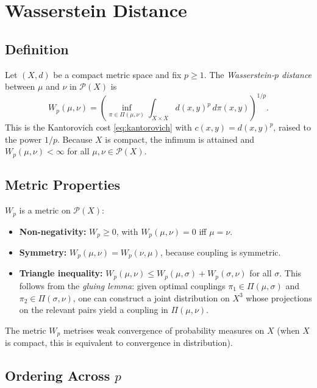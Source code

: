 \documentclass[12pt]{article}
\newcommand{\calP}{\mathcal{P}}
\begin{document}
\section{Wasserstein Distance}
\label{sec:wasserstein}

\subsection{Definition}

Let $(X, d)$ be a compact metric space and fix $p \geq 1$.
The \emph{Wasserstein-$p$ distance} between $\mu$ and $\nu$
in $\calP(X)$ is
\begin{equation}\label{eq:wasserstein}
  \boxed{W_p(\mu, \nu)
  = \left(\inf_{\pi \in \Pi(\mu,\nu)}
    \int_{X\times X} d(x,y)^p\,d\pi(x,y)\right)^{1/p}.}
\end{equation}
This is the Kantorovich cost \eqref{eq:kantorovich} with
$c(x,y) = d(x,y)^p$, raised to the power $1/p$.  Because $X$
is compact, the infimum is attained and $W_p(\mu,\nu) < \infty$
for all $\mu, \nu \in \calP(X)$.

\subsection{Metric Properties}

$W_p$ is a metric on $\calP(X)$:
\begin{itemize}
  \item \textbf{Non-negativity:} $W_p \geq 0$, with
    $W_p(\mu,\nu) = 0$ iff $\mu = \nu$.
  \item \textbf{Symmetry:} $W_p(\mu,\nu) = W_p(\nu,\mu)$,
    because coupling is symmetric.
  \item \textbf{Triangle inequality:} $W_p(\mu,\nu) \leq
    W_p(\mu,\sigma) + W_p(\sigma,\nu)$ for all $\sigma$.
    This follows from the \emph{gluing lemma}: given optimal
    couplings $\pi_1 \in \Pi(\mu,\sigma)$ and
    $\pi_2 \in \Pi(\sigma,\nu)$, one can construct a joint
    distribution on $X^3$ whose projections on the relevant
    pairs yield a coupling in $\Pi(\mu,\nu)$.
\end{itemize}
The metric $W_p$ metrises weak convergence of probability
measures on $X$ (when $X$ is compact, this is equivalent to
convergence in distribution).

\subsection{Ordering Across \texorpdfstring{$p$}{p}}
\end{document}
